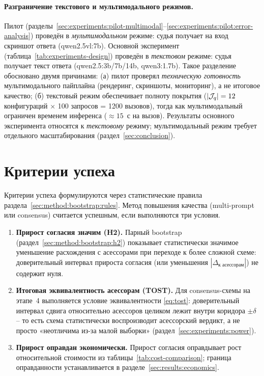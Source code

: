 \paragraph{Разграничение текстового и мультимодального режимов.}
Пилот (разделы~\ref{sec:experiments:pilot-multimodal}--\ref{sec:experiments:pilot:error-analysis}) проведён в \emph{мультимодальном} режиме: судья получает на вход скриншот ответа (qwen2.5vl:7b). Основной эксперимент (таблица~\ref{tab:experiments-design}) проведён в \emph{текстовом} режиме: судья получает текст ответа (qwen2.5:3b/7b/14b, qwen3:1.7b). Такое разделение обосновано двумя причинами: (а) пилот проверял \emph{техническую готовность} мультимодального пайплайна (рендеринг, скриншоты, мониторинг), а не итоговое качество; (б) текстовый режим обеспечивает полноту покрытия ($|\mathcal{J}_q| = 12$ конфигураций × 100 запросов = 1200 вызовов), тогда как мультимодальный ограничен временем инференса ($\approx 15$~с на вызов). Результаты основного эксперимента относятся к \emph{текстовому} режиму; мультимодальный режим требует отдельного масштабирования (раздел~\ref{sec:conclusion}).

\section{Критерии успеха}
\label{sec:experiments:criteria}

Критерии успеха формулируются через статистические правила
раздела~\ref{sec:method:bootstrap:rules}.
Метод повышения качества (multi-prompt или consensus) считается
успешным, если выполняются три условия.

\begin{enumerate}
    \item \textbf{Прирост согласия значим (H2).} Парный bootstrap
        (раздел~\ref{sec:method:bootstrap:h2}) показывает статистически
        значимое уменьшение расхождения с асессорами при переходе к более
        сложной схеме: доверительный интервал прироста согласия (или
        уменьшения $|\Delta_{\text{к асессорам}}|$) не содержит нуля.
    \item \textbf{Итоговая эквивалентность асессорам (TOST).}
        Для consensus-схемы на этапе~4 выполняется условие эквивалентности
        \eqref{eq:tost}: доверительный интервал сдвига относительно
        асессоров целиком лежит внутри коридора $\pm\delta$ -- то есть
        схема статистически воспроизводит асессорский вердикт, а не просто
        «неотличима из-за малой выборки»
        (раздел~\ref{sec:experiments:power}).
    \item \textbf{Прирост оправдан экономически.} Прирост согласия
        оправдывает рост относительной стоимости из
        таблицы~\ref{tab:cost-comparison}; граница оправданности
        устанавливается в разделе~\ref{sec:results:economics}.
\end{enumerate}

